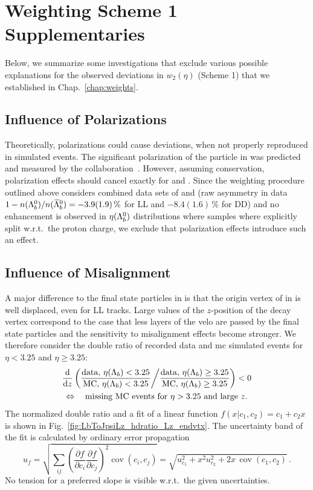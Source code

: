 \chapter{Weighting Scheme 1 Supplementaries}
\label{chap:apdx_weights}
Below, we summarize some investigations that exclude various possible explanations for the observed deviations in $w_2(\eta)$ (Scheme 1) that we established in Chap.~\ref{chap:weights}.

\section{Influence of Polarizations}
Theoretically, polarizations could cause deviations, when not properly reproduced in simulated events.
The significant polarization of the \Lz particle in \decay{\Lb}{\jpsi\Lz} was predicted~\cite{LbToJpsiLz_thpol} and measured by the \lhcb collaboration~\cite{LbToJpsiLz_polarization}.
However, assuming \CP conservation, polarization effects should cancel exactly for \Lb and \Lbbar.
Since the weighting procedure outlined above considers combined data sets of \Lb and \Lbbar (raw asymmetry in data $1 - n({{\Lambda}^0_{b}})/n({{\kern 0.1em\overline{\kern -0.1em\Lambda}}{}^0_{b}}) = -3.9(1.9)\,\%$ for \gls{LL} and $-8.4(1.6)\,\%$ for \gls{DD}) and no enhancement is observed in $\eta({{\Lambda}^0_{b}})$ distributions where samples where explicitly split w.r.t.\ the proton charge, we exclude that polarization effects introduce such an effect.

\section{Influence of Misalignment}
A major difference to the final state particles \proton\pim in \decay{\Lb}{\Dz\proton\pim} is that the origin vertex of \proton\pim in \decay{\Lb}{\jpsi\Lz} is well displaced, even for \gls{LL} tracks.
Large values of the $z$-position of the \Lz decay vertex correspond to the case that less layers of the \gls{velo} are passed by the final state particles and the sensitivity to misalignment effects become stronger.
We therefore consider the double ratio of recorded data and \gls{mc} simulated events for $\eta < 3.25$ and $\eta \ge 3.25$:
\begin{multline*}
    \frac{\mathrm{d}}{\mathrm{d}z} \left( \frac{\mathrm{data}, \, \eta(\Lambda_b) < 3.25}{\mathrm{MC}, \, \eta(\Lambda_b) < 3.25} \middle/ \frac{\mathrm{data}, \, \eta(\Lambda_b) \ge 3.25}{\mathrm{MC}, \, \eta(\Lambda_b) \ge 3.25} \right) < 0 \\
    \Leftrightarrow \quad \text{missing MC events for $\eta > 3.25$ and large $z$}.
\end{multline*}
The normalized double ratio and a fit of a linear function $f(x|c_1,c_2) = c_1 + c_2 x$ is shown in Fig.~\ref{fig:LbToJpsiLz_hdratio_Lz_endvtx}.
The uncertainty band of the fit is calculated by ordinary error propagation
\begin{equation*}
    u_f = \sqrt{\sum_{ij} \left( \frac{\partial f}{\partial c_i} \frac{\partial f}{\partial c_j} \right)^2 \operatorname{cov}(c_i, c_j)} = \sqrt{u_{c_1}^2 + x^2 u_{c_2}^2 + 2x \, \operatorname{cov}(c_1, c_2)} \,.
\end{equation*}
No tension for a preferred slope is visible w.r.t.\ the given uncertainties.

